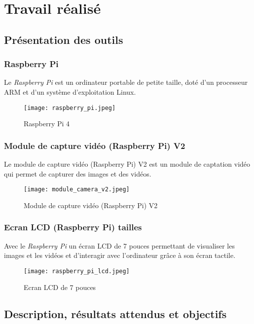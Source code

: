 \chapter{Travail réalisé}
    \section{Présentation des outils}
        \subsection{Raspberry Pi}
        Le \textit{Raspberry Pi} est un ordinateur portable de petite taille, doté d'un processeur ARM et d'un système d'exploitation Linux.
        \begin{figure}[h]
            \centering
            \texttt{[image: raspberry\_pi.jpeg]}
            \caption{Raspberry Pi 4}
        \end{figure}

        \subsection{Module de capture vidéo (Raspberry Pi) V2}
        Le module de capture vidéo (Raspberry Pi) V2 est un module de captation vidéo qui permet de capturer des images et des vidéos.
        \begin{figure}[h]
            \centering        
            \texttt{[image: module\_camera\_v2.jpeg]}
            \caption{Module de capture vidéo (Raspberry Pi) V2}
        \end{figure}

        \vspace{0.5cm}
 
        \subsection{Ecran LCD (Raspberry Pi) tailles}
        Avec le \textit{Raspberry Pi} un écran LCD de 7 pouces  permettant de visualiser les images et les vidéos et d'interagir avec l'ordinateur grâce à son écran tactile. 
        \begin{figure}[h]
            \centering
            \texttt{[image: raspberry\_pi\_lcd.jpeg]} 
            \caption{Ecran LCD de 7 pouces}
        \end{figure}
    

    \section{Description, résultats attendus et objectifs}
